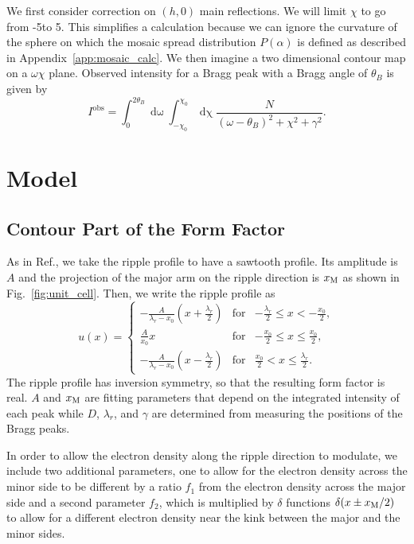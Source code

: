 We first consider correction on $(h,0)$ main reflections. We will limit 
$\chi$ to go from -5\textdegree to 5\textdegree. This simplifies a calculation
because we can ignore the curvature of the sphere on which the mosaic spread
distribution $P(\alpha)$ is defined as described in Appendix~\ref{app:mosaic_calc}.
We then imagine a two dimensional contour map on a $\omega\chi$ plane.
Observed intensity for a Bragg peak with a Bragg angle of $\theta_B$ is
given by
\begin{equation}
  I^\textrm{obs} = \int_0^{2\theta_B}\mathop{d\omega}
  \int_{-\chi_0}^{\chi_0}\mathop{d\chi}
  \frac{N}{(\omega-\theta_B)^2+\chi^2+\gamma^2}.
\end{equation}


\section{Model}
\subsection{Contour Part of the Form Factor}\label{sec:contour}
As in Ref.\cite{ref:Sun96}, we take the ripple profile to have a sawtooth profile. Its
amplitude is $A$ and the projection of the major arm on the 
ripple direction is $x_\textrm{M}$ as shown in Fig.~\ref{fig:unit_cell}. 
Then, we write the ripple profile as
\begin{equation}
  u(x) = \left\{
    \begin{array}{ccc}
    -\frac{A}{\lambda_r-x_0}\left(x+\frac{\lambda_r}{2}\right) 
      & \text{for} 
      & -\frac{\lambda_r}{2} \leq x < -\frac{x_0}{2}, \\
    \frac{A}{x_0}x 
      & \text{for} 
      & -\frac{x_0}{2} \leq x \leq \frac{x_0}{2}, \\
    -\frac{A}{\lambda_r-x_0} \left(x-\frac{\lambda_r}{2}\right)
      & \text{for} 
      & \frac{x_0}{2} < x \leq \frac{\lambda_r}{2}.
    \end{array} \right.
\end{equation}
The ripple profile has inversion symmetry, so that the resulting
form factor is real. $A$ and $x_\textrm{M}$ are fitting parameters that depend 
on the integrated intensity of each peak while $D$, $\lambda_r$, and $\gamma$
are determined from measuring the positions of the Bragg peaks.

In order to allow the electron density along the ripple direction to 
modulate, we include two additional parameters, one to allow for the electron
density across the minor side to be different by a ratio $f_1$ from the 
electron density across the major side and a second parameter $f_2$, which
is multiplied by $\delta$ functions $\delta(x \pm x_\textrm{M}/2)$ to allow for 
a different electron density near the kink between the major and the minor
sides. 


